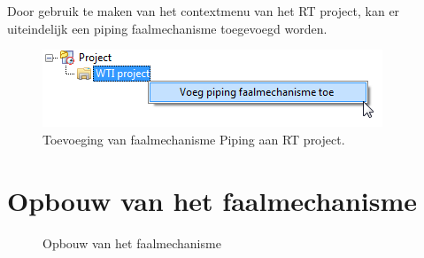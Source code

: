 Door gebruik te maken van het contextmenu van het RT project, kan er uiteindelijk een piping faalmechanisme toegevoegd worden.

\begin{figure} [H]
	\centering
		\includegraphics{figures/chapter_piping/addPipingMechanismToProject}
	\caption{Toevoeging van faalmechanisme Piping aan RT project.}
	\label{fig:fig5.3}
\end{figure}


\section{Opbouw van het faalmechanisme}

\begin{figure} [H]
	\centering
	\caption{Opbouw van het faalmechanisme}
	\label{fig:fig5.4}
\end{figure}

